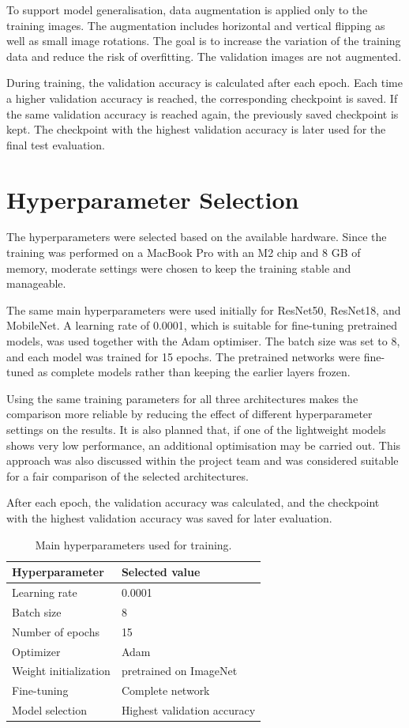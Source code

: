 {To support model generalisation, data augmentation is applied only to the training images. The augmentation includes horizontal and vertical flipping as well as small image rotations. The goal is to increase the variation of the training data and reduce the risk of overfitting. The validation images are not augmented.

During training, the validation accuracy is calculated after each epoch. Each time a higher validation accuracy is reached, the corresponding checkpoint is saved. If the same validation accuracy is reached again, the previously saved checkpoint is kept. The checkpoint with the highest validation accuracy is later used for the final test evaluation.

\section{Hyperparameter Selection}

The hyperparameters were selected based on the available hardware. Since the training was performed on a MacBook Pro with an M2 chip and 8 GB of memory, moderate settings were chosen to keep the training stable and manageable.

The same main hyperparameters were used initially for ResNet50, ResNet18, and MobileNet. A learning rate of 0.0001, which is suitable for fine-tuning pretrained models, was used together with the Adam optimiser. The batch size was set to 8, and each model was trained for 15 epochs. The pretrained networks were fine-tuned as complete models rather than keeping the earlier layers frozen.

Using the same training parameters for all three architectures makes the comparison more reliable by reducing the effect of different hyperparameter settings on the results. It is also planned that, if one of the lightweight models shows very low performance, an additional optimisation may be carried out. This approach was also discussed within the project team and was considered suitable for a fair comparison of the selected architectures.

After each epoch, the validation accuracy was calculated, and the checkpoint with the highest validation accuracy was saved for later evaluation.

\begin{table}[htbp]
\centering
\caption{Main hyperparameters used for training.}
\label{tab:hyperparameters}
\begin{tabularx}{\textwidth}{|p{5cm}|X|}
\hline
\textbf{Hyperparameter} & \textbf{Selected value} \\
\hline
Learning rate & 0.0001 \\
\hline
Batch size & 8 \\
\hline
Number of epochs & 15 \\
\hline
Optimizer & Adam \\
\hline
Weight initialization & pretrained on ImageNet\\
\hline
Fine-tuning & Complete network \\
\hline
Model selection & Highest validation accuracy \\
\hline
\end{tabularx}
\end{table}

}

